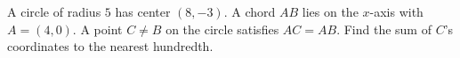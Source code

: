 A circle of radius $5$ has center $(8,-3)$. A chord $AB$ lies on the $x$-axis with $A=(4,0)$. A point $C\ne B$ on the circle satisfies $AC=AB$. Find the sum of $C$'s coordinates to the nearest hundredth.
